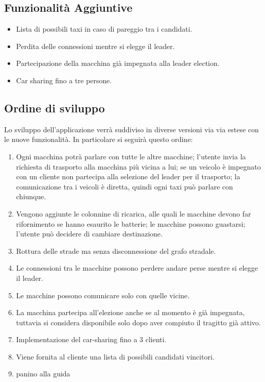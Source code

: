 \subsection{Funzionalità Aggiuntive}

\begin{itemize}
	\item Lista di possibili taxi in caso di pareggio tra i candidati.
	\item Perdita delle connessioni mentre si elegge il leader.
	\item Partecipazione della macchina già impegnata alla leader election.
	\item Car sharing fino a tre persone.
\end{itemize}

\subsection{Ordine di sviluppo}
Lo sviluppo dell'applicazione verrà suddiviso in diverse versioni via via estese con le nuove funzionalità. In particolare si seguirà questo ordine:

\begin{enumerate}
	\item Ogni macchina potrà parlare con tutte le altre macchine; l'utente invia la richiesta di trasporto alla macchina più vicina a lui; se un veicolo è impegnato con un cliente non partecipa alla selezione del leader per il trasporto; la comunicazione tra i veicoli è diretta, quindi ogni taxi può parlare con chiunque.
	\item Vengono aggiunte le colonnine di ricarica, alle quali le macchine devono far rifornimento se hanno esaurito le batterie; le macchine possono guastarsi; l'utente può decidere di cambiare destinazione.
	\item Rottura delle strade ma senza disconnessione del grafo stradale.
	\item Le connessioni tra le macchine possono perdere andare perse mentre si elegge il leader.
	\item Le macchine possono comunicare solo con quelle vicine.
	\item La macchina partecipa all'elezione anche se al momento è già impegnata, tuttavia si considera disponibile solo dopo aver compiuto il tragitto già attivo.
	\item Implementazione del car-sharing fino a 3 clienti.
	\item Viene fornita al cliente una lista di possibili candidati vincitori.
	\item panino alla guida
\end{enumerate}